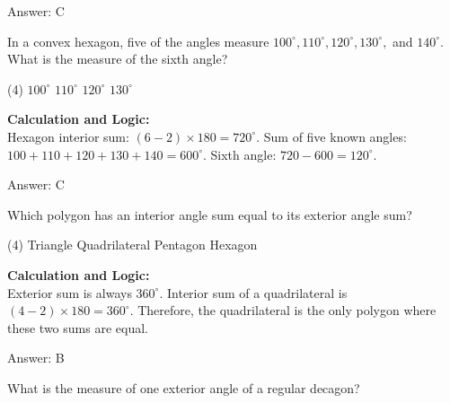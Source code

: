 \documentclass[11pt,paper=a4,answers]{exam}
\begin{document}
\begin{questions}
\begin{solution}
\vspace{30pt}

Answer: \colorbox{yellow!100}{C}
\end{solution}

\vspace{60pt}

\question
In a convex hexagon, five of the angles measure $100^\circ, 110^\circ, 120^\circ, 130^\circ,$ and $140^\circ$. What is the measure of the sixth angle?
\begin{tasks}(4)
    \task $100^\circ$
    \task $110^\circ$
    \task $120^\circ$
    \task $130^\circ$
\end{tasks}

\begin{solution}
\textbf{Calculation and Logic:} \\
Hexagon interior sum: $(6 - 2) \times 180 = 720^\circ$. Sum of five known angles: $100 + 110 + 120 + 130 + 140 = 600^\circ$. Sixth angle: $720 - 600 = 120^\circ$.

\vspace{30pt}

Answer: \colorbox{yellow!100}{C}
\end{solution}

\vspace{60pt}

\question
Which polygon has an interior angle sum equal to its exterior angle sum?
\begin{tasks}(4)
    \task Triangle
    \task Quadrilateral
    \task Pentagon
    \task Hexagon
\end{tasks}

\begin{solution}
\textbf{Calculation and Logic:} \\
Exterior sum is always $360^\circ$. Interior sum of a quadrilateral is $(4 - 2) \times 180 = 360^\circ$. Therefore, the quadrilateral is the only polygon where these two sums are equal.

\vspace{30pt}

Answer: \colorbox{yellow!100}{B}
\end{solution}

\vspace{60pt}

\question
What is the measure of one exterior angle of a regular decagon?


\end{questions}
\end{document}
